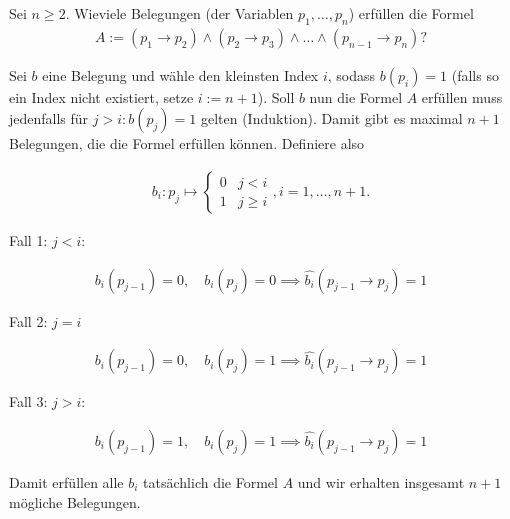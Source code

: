 
\begin{exercise}[22]

Sei $n \geq 2$.
Wieviele Belegungen (der Variablen $p_1,\dots,p_n$) erfüllen die Formel
\begin{align*}
  A := (p_1 \to p_2) \land (p_2 \to p_3) \land \dots \land (p_{n-1} \to p_n)?
\end{align*}

\end{exercise}


\begin{solution}

	Sei $b$ eine Belegung und wähle den kleinsten Index $i$, sodass $b(p_i) = 1$
(falls so ein Index nicht existiert, setze $i := n + 1$).
Soll $b$ nun die Formel $A$ erfüllen muss jedenfalls für $j > i: b(p_j) = 1$ gelten (Induktion).
Damit gibt es maximal $n+1$ Belegungen, die die Formel erfüllen können.
Definiere also

\begin{align*}
  b_i: p_j \mapsto \begin{cases}
    0 & j < i \\
    1 & j \geq i
  \end{cases}, i = 1,\dots,n+1.
\end{align*}

Fall 1: $j < i:$

\begin{align*}
  b_i(p_{j-1}) = 0, \quad b_i(p_j) = 0 \implies \hat{b_i}(p_{j-1} \to p_j) = 1
\end{align*}

Fall 2: $j = i$

\begin{align*}
  b_i(p_{j-1}) = 0, \quad b_i(p_j) = 1 \implies \hat{b_i}(p_{j-1} \to p_j) = 1
\end{align*}

Fall 3: $j > i:$

\begin{align*}
  b_i(p_{j-1}) = 1, \quad b_i(p_j) = 1 \implies \hat{b_i}(p_{j-1} \to p_j) = 1
\end{align*}

Damit erfüllen alle $b_i$ tatsächlich die Formel $A$ und wir erhalten insgesamt $n+1$ mögliche Belegungen.

\end{solution}

